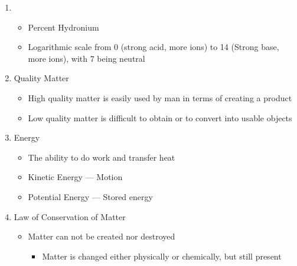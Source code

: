 \documentclass[12pt]{article}
\begin{document}
\begin{enumerate}
  \item {}

    \begin{itemize}

      \item Percent Hydronium

      \item Logarithmic scale from 0 (strong acid, more  ions) to 14 (Strong base, more  ions), with 7 being neutral

    \end{itemize}

  \item Quality Matter

    \begin{itemize}

      \item High quality matter is easily used by man in terms of creating a product

      \item Low quality matter is difficult to obtain or to convert into usable objects

    \end{itemize}

  \item Energy

    \begin{itemize}

      \item The ability to do work and transfer heat

      \item Kinetic Energy — Motion

      \item Potential Energy — Stored energy

    \end{itemize}

  \item Law of Conservation of Matter

    \begin{itemize}

      \item Matter can not be created nor destroyed

        \begin{itemize}

          \item Matter is changed either physically or chemically, but still present

        \end{itemize}


\end{itemize}
\end{enumerate}
\end{document}
